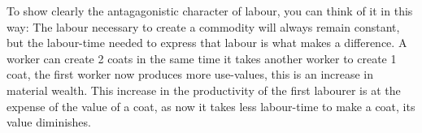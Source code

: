 \documentclass[a4paper,10pt]{article}
\begin{document}
To show clearly the antagagonistic character of labour, you can think of it in this way: The labour necessary to create a
commodity will always remain constant, but the labour-time needed to express that labour is what makes a difference. A worker
can create 2 coats in the same time it takes another worker to create 1 coat, the first worker now produces more use-values,
this is an increase in material wealth. This increase in the productivity of the first labourer is at the expense of the
value of a coat, as now it takes less labour-time to make a coat, its value diminishes.  
\end{document}
